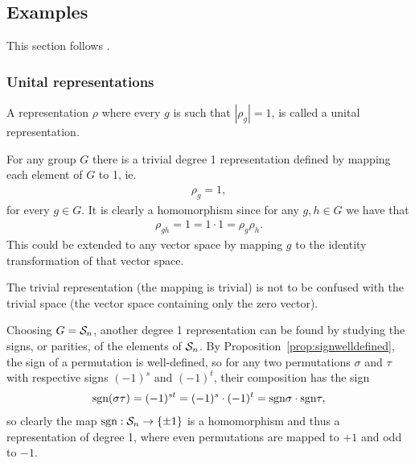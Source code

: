 \subsection{Examples}\label{sect:basicreprs}

This section follows \cite[1.?]{Serre}.

\subsubsection{Unital representations}

	A representation $\rho$ where every $g$ is such that $|\rho_g| = 1$, is called a unital representation.

\begin{example}
	For any group $G$ there is a trivial degree 1 representation defined by mapping each element of $G$ to 1, ie.
	\begin{align*}
		\rho_g = 1,
	\end{align*}
	for every $g \in G$. It is clearly a homomorphism since for any $g,h \in G$ we have that
	\begin{align*}
		\rho_{gh} = 1 = 1 \cdot 1 = \rho_g \rho_h.
	\end{align*}
	This could be extended to any vector space by mapping $g$ to the identity transformation of that vector space.
\end{example}

\begin{note}
	The trivial representation (the mapping is trivial) is not to be confused with the trivial space (the vector space containing only the zero vector).
\end{note}

\begin{example}
	Choosing $G = \mathcal{S}_n$, another degree 1 representation can be found by studying the signs, or parities, of the elements of $\mathcal{S}_n$. By Proposition~\ref{prop:signwelldefined}, the sign of a permutation is well-defined, so for any two permutations $\sigma$ and $\tau$ with respective signs $(-1)^s$ and $(-1)^t$, their composition has the sign
	\begin{align*}
		\text{sgn}(\sigma\tau) = (-1)^{st} = (-1)^s \cdot (-1)^t = \text{sgn}\sigma \cdot \text{sgn} \tau,
	\end{align*}
	so clearly the map $\text{sgn}: \mathcal{S}_n \rightarrow \{\pm 1\}$ is a homomorphism and thus a representation of degree 1, where even permutations are mapped to $+1$ and odd to $-1$.
\end{example}

